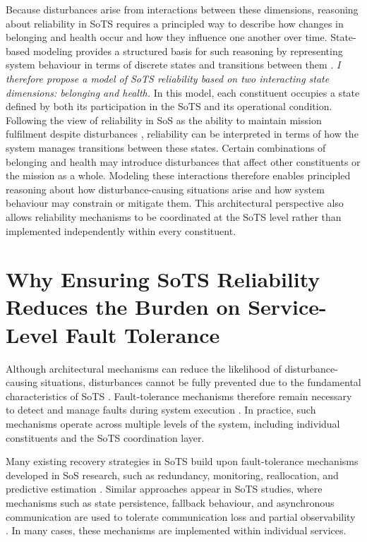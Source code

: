 Because disturbances arise from interactions between these dimensions, reasoning about reliability in SoTS requires a principled way to describe how changes in belonging and health occur and how they influence one another over time. State-based modeling provides a structured basis for such reasoning by representing system behaviour in terms of discrete states and transitions between them \cite{liang2006comparative}. \emph{I therefore propose a model of SoTS reliability based on two interacting state dimensions: belonging and health.} In this model, each constituent occupies a state defined by both its participation in the SoTS and its operational condition. Following the view of reliability in SoS as the ability to maintain mission fulfilment despite disturbances \cite{ferreira2023towards}, reliability can be interpreted in terms of how the system manages transitions between these states. Certain combinations of belonging and health may introduce disturbances that affect other constituents or the mission as a whole. Modeling these interactions therefore enables principled reasoning about how disturbance-causing situations arise and how system behaviour may constrain or mitigate them. This architectural perspective also allows reliability mechanisms to be coordinated at the SoTS level rather than implemented independently within every constituent.

\section{Why Ensuring SoTS Reliability Reduces the Burden on Service-Level Fault Tolerance}
\label{sec:reducing-fault-tolerance-burden}

Although architectural mechanisms can reduce the likelihood of disturbance-causing situations, disturbances cannot be fully prevented due to the fundamental characteristics of SoTS \cite{nielsen2015systems,ferreira2023towards}. Fault-tolerance mechanisms therefore remain necessary to detect and manage faults during system execution \cite{hanmer2013patterns,avizienis2004basic}. In practice, such mechanisms operate across multiple levels of the system, including individual constituents and the SoTS coordination layer.

Many existing recovery strategies in SoTS build upon fault-tolerance mechanisms developed in SoS research, such as redundancy, monitoring, reallocation, and predictive estimation \cite{ferreira2021reliability,uday2015designing,abdelmoumen2026comprehensive}. Similar approaches appear in SoTS studies, where mechanisms such as state persistence, fallback behaviour, and asynchronous communication are used to tolerate communication loss and partial observability \cite{esterle2021digital,larsen2024towards,lopez2023modeling,chen2018digital,joseph2021aggregated}. In many cases, these mechanisms are implemented within individual services.

